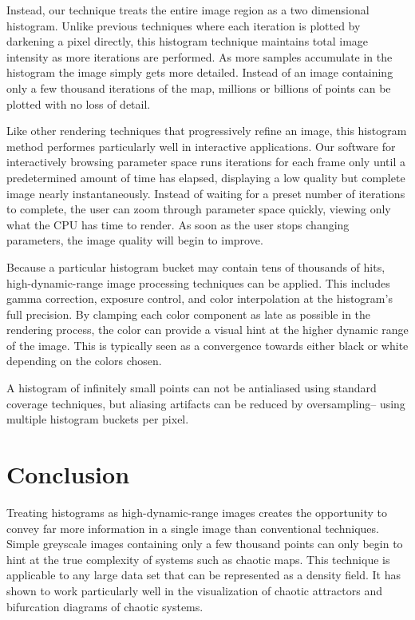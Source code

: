 \documentclass{acmsiggraph}
\begin{document}
Instead, our technique treats the entire image region as a two dimensional
histogram. Unlike previous techniques where each iteration is plotted by
darkening a pixel directly, this histogram technique maintains total image
intensity as more iterations are performed. As more samples accumulate in the
histogram the image simply gets more detailed. Instead of an image containing
only a few thousand iterations of the map, millions or billions of points can
be plotted with no loss of detail.

Like other rendering techniques that progressively refine an image, this
histogram method performes particularly well in interactive applications.
Our software for interactively browsing parameter space runs iterations
for each frame only until a predetermined amount of time has elapsed,
displaying a low quality but complete image nearly instantaneously.
Instead of waiting for a preset number of iterations to complete, the user
can zoom through parameter space quickly, viewing only what the CPU has time
to render. As soon as the user stops changing parameters, the image quality
will begin to improve.

Because a particular histogram bucket may contain tens of thousands of hits,
high-dynamic-range image processing techniques can be applied. This includes
gamma correction, exposure control, and color interpolation at the histogram's
full precision. By clamping each color component as late as possible in the
rendering process, the color can provide a visual hint at the higher
dynamic range of the image. This is typically seen as a convergence towards
either black or white depending on the colors chosen.

A histogram of infinitely small points can not be antialiased using standard
coverage techniques, but aliasing artifacts can be reduced by oversampling--
using multiple histogram buckets per pixel.

\section{Conclusion}
Treating histograms as high-dynamic-range images creates the opportunity to
convey far more information in a single image than conventional techniques.
Simple greyscale images containing only a few thousand points can only begin
to hint at the true complexity of systems such as chaotic maps. This technique
is applicable to any large data set that can be represented as a density field.
It has shown to work particularly well in the visualization of chaotic
attractors and bifurcation diagrams of chaotic systems.
\end{document}
